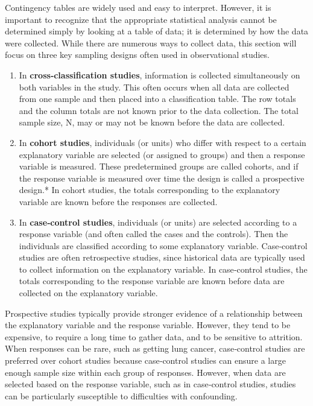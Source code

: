 \documentclass[
]{report}
\providecommand{\tightlist}{%
  \setlength{\itemsep}{0pt}\setlength{\parskip}{0pt}}
\begin{document}
Contingency tables are widely used and easy to interpret. However, it is important to recognize that the appropriate statistical analysis cannot be determined simply by looking at a table of data; it is determined by how the data were collected. While there are numerous ways to collect data, this section will focus on three key sampling designs often used in observational studies.

\begin{enumerate}
\def\labelenumi{\arabic{enumi}.}
\tightlist
\item
  In \textbf{cross‑classification studies}, information is collected simultaneously on both variables in the study. This often occurs when all data are collected from one sample and then placed into a classification table. The row totals and the column totals are not known prior to the data collection. The total sample size, N, may or may not be known before the data are collected.\\
\item
  In \textbf{cohort studies}, individuals (or units) who differ with respect to a certain explanatory variable are selected (or assigned to groups) and then a response variable is measured. These predetermined groups are called cohorts, and if the response variable is measured over time the design is called a prospective design.* In cohort studies, the totals corresponding to the explanatory variable are known before the responses are collected.\\
\item
  In \textbf{case‑control studies}, individuals (or units) are selected according to a response variable (and often called the cases and the controls). Then the individuals are classified according to some explanatory variable. Case‑control studies are often retrospective studies, since historical data are typically used to collect information on the explanatory variable. In case‑control studies, the totals corresponding to the response variable are known before data are collected on the explanatory variable.
\end{enumerate}

Prospective studies typically provide stronger evidence of a relationship between the explanatory variable and the response variable. However, they tend to be expensive, to require a long time to gather data, and to be sensitive to attrition. When responses can be rare, such as getting lung cancer, case‑control studies are preferred over cohort studies because case‑control studies can ensure a large enough sample size within each group of responses. However, when data are selected based on the response variable, such as in case‑control studies, studies can be particularly susceptible to difficulties with confounding.
\end{document}
